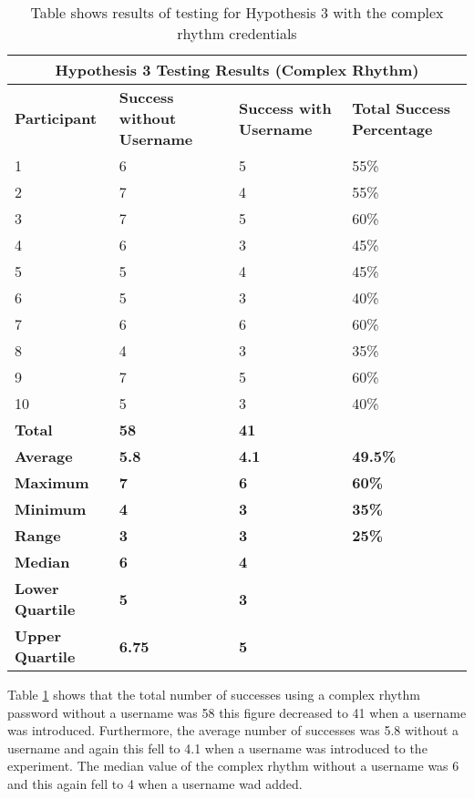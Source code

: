 \documentclass{article}
\begin{document}
{
\begin{table} [H]
\centering
\begin{tabular}{ |p{2cm}|p{4cm}|p{4cm}| p{4cm} | }
\hline
\multicolumn{4}{|c|}{\textbf{Hypothesis 3 Testing Results (Complex Rhythm)}} \\
\hline
\textbf{Participant} & \textbf{Success without Username} & \textbf{Success with Username} & \textbf{Total Success Percentage} \\
\hline
1 & 6 & 5 & 55\% \\
\hline
2 & 7 & 4 & 55\% \\
\hline
3 & 7 & 5 & 60\% \\
\hline
4 & 6 & 3 & 45\%  \\
\hline
5 & 5 & 4 & 45\% \\
\hline
6 & 5 & 3 & 40\% \\
\hline
7 & 6 & 6 & 60\% \\
\hline
8 & 4 & 3 & 35\% \\
\hline
9 & 7 & 5 & 60\% \\
\hline
10 & 5 & 3 & 40\% \\
\hline
\textbf{Total} & \textbf{58} & \textbf{41} & \\
\hline
\textbf{Average} & \textbf{5.8} & \textbf{4.1} & \textbf{49.5\%} \\
\hline
\textbf{Maximum} & \textbf{7} & \textbf{6} & \textbf{60\%} \\
\hline
\textbf{Minimum} & \textbf{4} & \textbf{3} & \textbf{35\%} \\
\hline
\textbf{Range} & \textbf{3} & \textbf{3} & \textbf{25\%} \\
\hline
\textbf{Median} & \textbf{6} & \textbf{4} & \\
\hline
\textbf{Lower Quartile} & \textbf{5} & \textbf{3} & \\
\hline
\textbf{Upper Quartile} & \textbf{6.75} & \textbf{5} & \\
\hline
\end{tabular}
\caption{Table shows results of testing for Hypothesis 3 with the complex rhythm credentials}
\label{table:4}
\end{table}
}

Table \ref{table:4} shows that the total number of successes using a complex rhythm password without a username was 58 this figure decreased to 41 when a username was introduced. Furthermore, the average number of successes was 5.8 without a username and again this fell to 4.1 when a username was introduced to the experiment. The median value of the complex rhythm without a username was 6 and this again fell to 4 when a username wad added.
\end{document}
